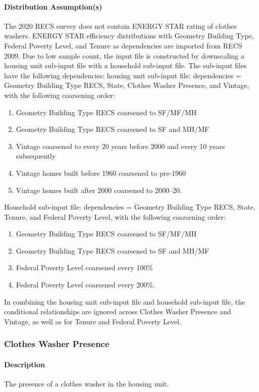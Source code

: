 \paragraph{Distribution Assumption(s)}
The 2020 RECS survey does not contain ENERGY STAR rating of clothes washers. ENERGY STAR efficiency distributions with Geometry Building Type, Federal Poverty Level, and Tenure as dependencies are imported from RECS 2009. Due to low sample count, the input file is constructed by downscaling a housing unit sub-input file with a household sub-input file. The sub-input files have the following dependencies:
housing unit sub-input file: dependencies = Geometry Building Type RECS, State, Clothes Washer Presence, and Vintage, with the following coarsening order:
\begin{enumerate}
    \item  Geometry Building Type RECS coarsened to SF/MF/MH
    \item Geometry Building Type RECS coarsened to SF and MH/MF
    \item Vintage coarsened to every 20 years before 2000 and every 10 years subsequently
    \item Vintage homes built before 1960 coarsened to pre-1960
    \item Vintage homes built after 2000 coarsened to 2000--20.
\end{enumerate}
Household sub-input file: dependencies = Geometry Building Type RECS, State, Tenure, and Federal Poverty Level, with the following coarsening order:
\begin{enumerate}
    \item Geometry Building Type RECS coarsened to SF/MF/MH
    \item Geometry Building Type RECS coarsened to SF and MH/MF
    \item Federal Poverty Level coarsened every 100\%
    \item Federal Poverty Level coarsened every 200\%.
\end{enumerate}
In combining the housing unit sub-input file and household sub-input file, the conditional relationships are ignored across Clothes Washer Presence and Vintage, as well as for Tenure and Federal Poverty Level.

\subsubsection{Clothes Washer Presence}\label{clothes_washer_presence}
\paragraph{Description}
The presence of a clothes washer in the housing unit.

